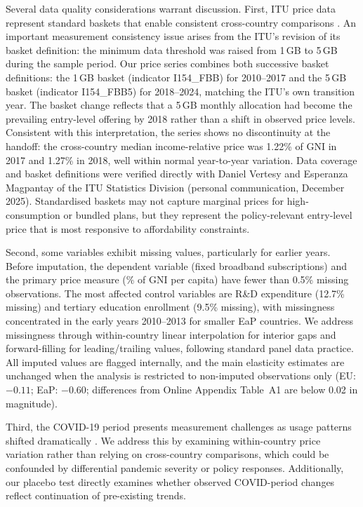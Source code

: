 Several data quality considerations warrant discussion. First, ITU price data represent
standard baskets that enable consistent cross-country comparisons \citep{itu2024data}.
An important measurement consistency issue arises from the ITU's revision of its basket
definition: the minimum data threshold was raised from 1\,GB to 5\,GB during the sample
period. Our price series combines both successive basket definitions: the 1\,GB basket (indicator I154\_FBB) for 2010--2017 and the 5\,GB basket (indicator I154\_FBB5) for 2018--2024, matching the ITU's own transition year. The basket change reflects that a 5\,GB monthly allocation had become the prevailing entry-level offering by 2018 rather than a shift in observed price levels. Consistent with this interpretation, the series shows no discontinuity at the handoff: the cross-country median income-relative price was 1.22\% of GNI in 2017 and 1.27\% in 2018, well within normal year-to-year variation. Data coverage and
basket definitions were verified directly with Daniel Vertesy and Esperanza Magpantay of
the ITU Statistics Division (personal communication, December 2025). Standardised baskets may not
capture marginal prices for high-consumption or bundled plans, but they represent the
policy-relevant entry-level price that is most responsive to affordability constraints.

Second, some variables exhibit missing values, particularly for earlier years.
Before imputation, the dependent variable (fixed broadband subscriptions) and the
primary price measure (\% of GNI per capita) have fewer than 0.5\% missing observations.
The most affected control variables are R\&D expenditure (12.7\% missing) and tertiary
education enrollment (9.5\% missing), with missingness concentrated in the early years
2010--2013 for smaller EaP countries. We address missingness through within-country linear interpolation
for interior gaps and forward-filling for leading/trailing values, following
standard panel data practice. All imputed values are flagged internally, and the
main elasticity estimates are unchanged when the analysis is restricted to non-imputed
observations only (EU: $-0.11$; EaP: $-0.60$; differences from Online Appendix Table~A1
are below 0.02 in magnitude).

Third, the COVID-19 period presents measurement challenges as usage patterns shifted dramatically \citep{oecd2021covid}. We address this by examining within-country price variation rather than relying on cross-country comparisons, which could be confounded by differential pandemic severity or policy responses. Additionally, our placebo test directly examines whether observed COVID-period changes reflect continuation of pre-existing trends.

